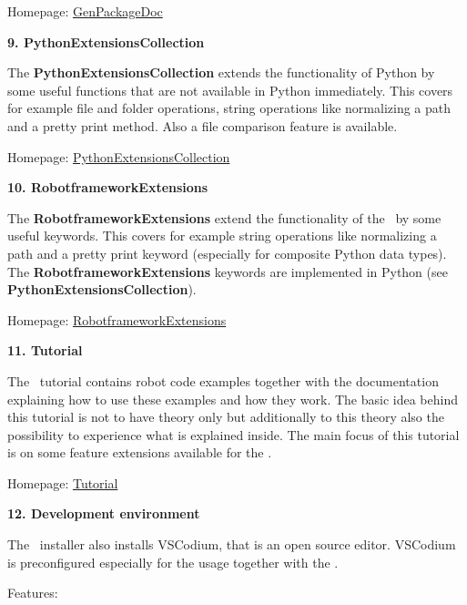 Homepage: \href{https://github.com/test-fullautomation/python-genpackagedoc}{GenPackageDoc}

\vspace{2ex}

\textbf{9. PythonExtensionsCollection}

The \textbf{PythonExtensionsCollection} extends the functionality of Python by some useful functions that are not available in Python immediately.
This covers for example file and folder operations, string operations like normalizing a path and a pretty print method.
Also a file comparison feature is available.

Homepage: \href{https://github.com/test-fullautomation/python-extensions-collection}{PythonExtensionsCollection}

\vspace{2ex}

\textbf{10. RobotframeworkExtensions}

The \textbf{RobotframeworkExtensions} extend the functionality of the \rfwcore\ by some useful keywords.
This covers for example string operations like normalizing a path and a pretty print keyword (especially for composite
Python data types). The \textbf{RobotframeworkExtensions} keywords are implemented in Python (see \textbf{PythonExtensionsCollection}).

Homepage: \href{https://github.com/test-fullautomation/robotframework-extensions-collection}{RobotframeworkExtensions}

\vspace{2ex}

\textbf{11. Tutorial}

The \rfw\ tutorial contains robot code examples together with the documentation explaining how to use these examples and how they work.
The basic idea behind this tutorial is not to have theory only but additionally to this theory also the possibility to experience what is explained inside.
The main focus of this tutorial is on some feature extensions available for the \rfwcore.

Homepage: \href{https://github.com/test-fullautomation/robotframework-tutorial}{Tutorial}

\newpage

\textbf{12. Development environment}

The \rfw\ installer also installs VSCodium, that is an open source editor. VSCodium is preconfigured especially for the usage together with
the \rfw.

Features:

